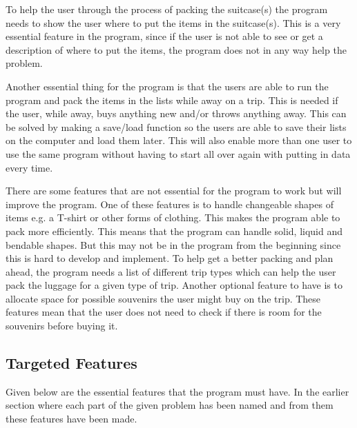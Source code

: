 To help the user through the process of packing the suitcase(s) the program needs to show the user where to put the items in the suitcase(s). This is a very essential feature in the program, since if the user is not able to see or get a description of where to put the items, the program does not in any way help the problem.

Another essential thing for the program is that the users are able to run the program and pack the items in the lists while away on a trip. This is needed if the user, while away, buys anything new and/or throws anything away. This can be solved by making a save/load function so the users are able to save their lists on the computer and load them later. This will also enable more than one user to use the same program without having to start all over again with putting in data every time.

There are some features that are not essential for the program to work but will improve the program. 
One of these features is to handle changeable shapes of items e.g. a T-shirt or other forms of clothing. This makes the program able to pack more efficiently. This means that the program can handle solid, liquid and bendable shapes. But this may not be in the program from the beginning since this is hard to develop and implement.
To help get a better packing and plan ahead, the program needs a list of different trip types which can help the user pack the luggage for a given type of trip.
Another optional feature to have is to allocate space for possible souvenirs the user might buy on the trip. These features mean that the user does not need to check if there is room for the souvenirs before buying it.

\subsection{Targeted Features}
Given below are the essential features that the program must have. In the earlier section where each part of the given problem has been named and from them these features have been made.\newline


